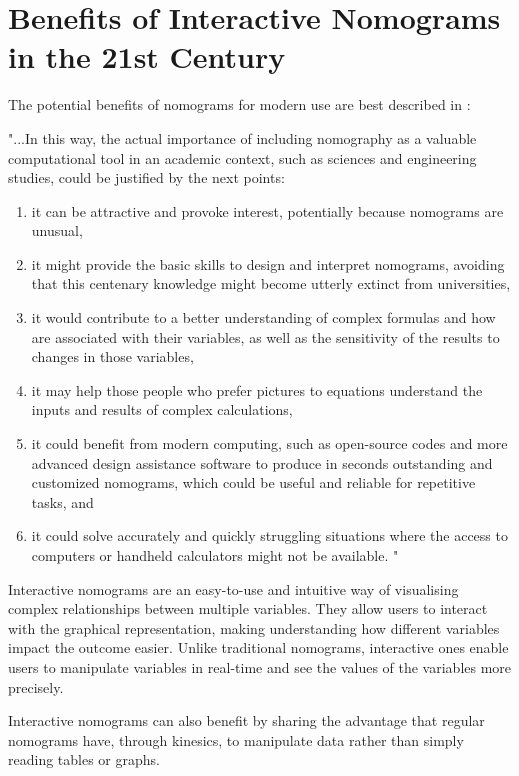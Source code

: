 \documentclass{l4proj}
\begin{document}
\section{Benefits of Interactive Nomograms in the 21st Century}


The potential benefits of nomograms for modern use are best described in \citep{martinez-pagan_nomography_2022}:

"...In this way, the actual importance of including nomography as a
valuable computational tool in an academic context, such as sciences and
engineering studies, could be justified by the next points: 
\begin{enumerate}
    \item it can be attractive and provoke interest, potentially because nomograms are unusual, 
    \item it might provide the basic skills to design and interpret nomograms, avoiding that this centenary knowledge might become utterly extinct from universities, 
    \item  it would contribute to a better understanding of complex formulas and how are associated with their variables, as well as the sensitivity of the results to changes in those variables, 
    \item it may help those people who prefer pictures to equations understand the inputs and results of complex calculations, 
    \item  it could benefit from modern computing, such as open-source codes and more advanced design assistance software to produce in seconds outstanding and customized nomograms, which could be useful and reliable for repetitive tasks, and
    \item it could solve accurately and quickly struggling situations where the
    access to computers or handheld calculators might not be available. "
\end{enumerate}

Interactive nomograms are an easy-to-use and intuitive way of visualising complex relationships between multiple variables. They allow users to interact with the graphical representation, making understanding how different variables impact the outcome easier. Unlike traditional nomograms, interactive ones enable users to manipulate variables in real-time and see the values of the variables more precisely. 

Interactive nomograms can also benefit by sharing the advantage that regular nomograms have, through kinesics, to manipulate data rather than simply reading tables or graphs. \citep{schwartz_physical_1999}
\end{document}
